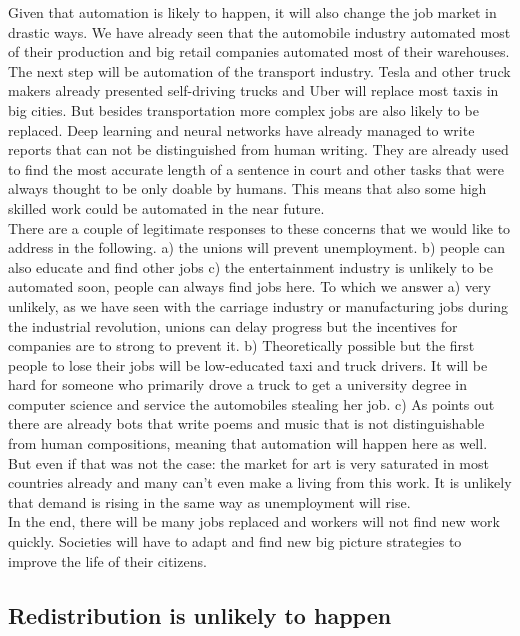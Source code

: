 \documentclass[conference]{IEEEtran}
\begin{document}
Given that automation is likely to happen, it will also change the job market in drastic ways. We have already seen that the automobile industry automated most of their production and big retail companies automated most of their warehouses. The next step will be automation of the transport industry. Tesla and other truck makers already presented self-driving trucks and Uber will replace most taxis in big cities. But besides transportation more complex jobs are also likely to be replaced. Deep learning and neural networks have already managed to write reports that can not be distinguished from human writing. They are already used to find the most accurate length of a sentence in court and other tasks that were always thought to be only doable by humans. This means that also some high skilled work could be automated in the near future.\\
There are a couple of legitimate responses to these concerns that we would like to address in the following. a) the unions will prevent unemployment. b) people can also educate and find other jobs c) the entertainment industry is unlikely to be automated soon, people can always find jobs here. To which we answer a) very unlikely, as we have seen with the carriage industry or manufacturing jobs during the industrial revolution, unions can delay progress but the incentives for companies are to strong to prevent it. b) Theoretically possible but the first people to lose their jobs will be low-educated taxi and truck drivers. It will be hard for someone who primarily drove a truck to get a university degree in computer science and service the automobiles stealing her job. c) As \cite{AutomationCPGgrey} points out there are already bots that write poems and music that is not distinguishable from human compositions, meaning that automation will happen here as well. But even if that was not the case: the market for art is very saturated in most countries already and many can't even make a living from this work. It is unlikely that demand is rising in the same way as unemployment will rise. \\
In the end, there will be many jobs replaced and workers will not find new work quickly. Societies will have to adapt and find new big picture strategies to improve the life of their citizens.

\subsection{Redistribution is unlikely to happen}
\end{document}
